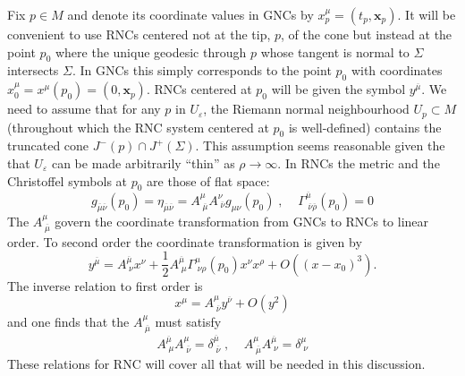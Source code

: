 \documentclass[12pt]{article}
\newcommand{\be}{\begin{equation}}
\newcommand{\ee}{\end{equation}}
\newcommand{\mb}[1]{\marginnote{\texttt{\small MB:\,#1}}}
\begin{document}
Fix $p\in M$ and denote its coordinate values in GNCs by $x^\mu_p= (t_p,\mathbf x_p)$. It will be convenient to use RNCs centered not at the tip, $p$, of the cone but instead at the point $p_0$ where the unique geodesic through $p$ whose tangent is normal to $\Sigma$ intersects $\Sigma$. In GNCs this simply corresponds to the point $p_0$ with coordinates $x_0^\mu=x^\mu (p_0)= (0,\mathbf x_p)$. RNCs centered at $p_0$ will be given the symbol $y^{\overline{\mu}}$.
We need to assume that for any $p$ in $U_\varepsilon$, the Riemann normal neighbourhood $U_p\subset M$ (throughout which the RNC system centered at $p_0$ is well-defined) contains the truncated cone $J^- (p)\cap J^+ (\Sigma)$. This assumption seems reasonable given the that $U_\varepsilon$ can be made arbitrarily ``thin'' as $\rho\rightarrow\infty$. In RNCs the metric and the Christoffel symbols at $p_0$ are those of flat space:
\be\label{eq:RNCMetricTransAtPAndChris}
g_{\overline{\mu} \overline{\nu}} (p_0)=\eta_{\overline{\mu} \overline{\nu}}=A^{\mu}_{\;\overline{\mu}}A^{\nu}_{\;\overline{\nu}}g_{\mu\nu} (p_0)\;,\;\;\;\;\Gamma^{\overline{\mu}}_{\;\overline{\nu}\overline{\rho}} (p_0)=0
\ee
The $A^{\mu}_{\;\overline{\mu}}$ govern the coordinate transformation from GNCs to RNCs to linear order. %
To second order the coordinate transformation is given by
\be\label{eq:RNCtotaltrans}
y^{\overline{\mu}}=A^{\overline{\mu}}_{\;\nu}x^\nu+\frac{1}{2}A^{\overline{\mu}}_{\;\mu}\Gamma^{\mu}_{\;\nu\rho} (p_0)x^\nu x^\rho+O ( (x-x_0)^3).
\ee
The inverse relation to first order is 
\be\label{eq:RNCinversetrans}
x^{\mu}=A^{\mu}_{\;\overline{\nu}}y^{\overline{\nu}}+O (y^2)
\ee
and one finds that the $A^{\mu}_{\;\overline{\mu}}$ must satisfy
\be\label{eq:RNCeqnforA}
A^{\overline{\mu}}_{\;\mu}A^{\mu}_{\;\overline{\nu}}=\delta^{\overline{\mu}}_{\;\overline{\nu}}\;,\;\;\;\;A^{\mu}_{\;\overline{\mu}}A^{\overline{\mu}}_{\;\nu}=\delta^{\mu}_{\;\nu}
\ee
These relations for RNC will cover all that will be needed in this discussion.
\end{document}
